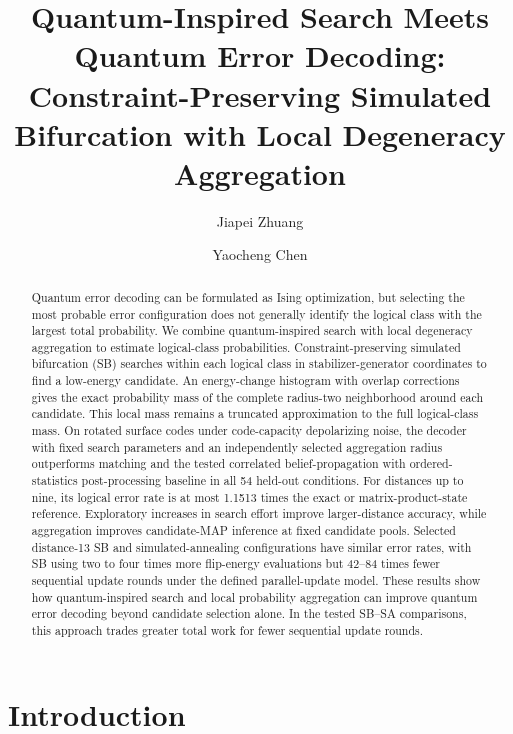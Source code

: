 \documentclass[aps,prapplied,reprint,superscriptaddress,amsmath,amssymb,floatfix,nofootinbib]{revtex4-2}
\begin{document}
\title{Quantum-Inspired Search Meets Quantum Error Decoding: Constraint-Preserving Simulated Bifurcation with Local Degeneracy Aggregation}
\author{Jiapei Zhuang}
\author{Yaocheng Chen}
\begin{abstract}
Quantum error decoding can be formulated as Ising optimization, but
selecting the most probable error configuration does not generally
identify the logical class with the largest total probability. We
combine quantum-inspired search with local degeneracy aggregation to
estimate logical-class probabilities. Constraint-preserving simulated
bifurcation (SB) searches within each logical class in
stabilizer-generator coordinates to find a low-energy candidate. An
energy-change histogram with overlap corrections gives the exact
probability mass of the complete radius-two neighborhood around each
candidate. This local mass remains a truncated approximation to the full
logical-class mass. On rotated surface codes under code-capacity
depolarizing noise, the decoder with fixed search parameters and an
independently selected aggregation radius outperforms matching and the
tested correlated belief-propagation with ordered-statistics
post-processing baseline in all 54 held-out conditions. For distances up
to nine, its logical error rate is at most 1.1513 times the exact or
matrix-product-state reference. Exploratory increases in search effort
improve larger-distance accuracy, while aggregation improves
candidate-MAP inference at fixed candidate pools. Selected distance-13
SB and simulated-annealing configurations have similar error rates, with
SB using two to four times more flip-energy evaluations but 42--84 times
fewer sequential update rounds under the defined parallel-update model.
These results show how quantum-inspired search and local probability
aggregation can improve quantum error decoding beyond candidate
selection alone. In the tested SB--SA comparisons, this approach trades
greater total work for fewer sequential update rounds.
\end{abstract}\maketitle
\section{Introduction}\label{i.-introduction}
\end{document}
